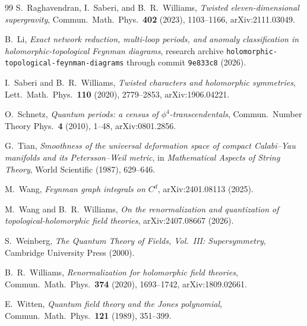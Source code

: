 \documentclass[11pt,a4paper]{article}
\theoremstyle{plain}
\theoremstyle{definition}
\theoremstyle{remark}
\numberwithin{equation}{section}
\numberwithin{figure}{section}
\numberwithin{table}{section}
\def\mathbb#1{#1}%
\begin{document}
\begin{thebibliography}{99}
S.~Raghavendran, I.~Saberi, and B.~R.~Williams,
\emph{Twisted eleven-dimensional supergravity},
Commun.\ Math.\ Phys.\ \textbf{402} (2023), 1103--1166, arXiv:2111.03049.

B.~Li,
\emph{Exact network reduction, multi-loop periods, and anomaly classification in holomorphic-topological Feynman diagrams},
research archive \texttt{holomorphic-topological-feynman-diagrams} through commit \texttt{9e833c8} (2026).

I.~Saberi and B.~R.~Williams,
\emph{Twisted characters and holomorphic symmetries},
Lett.\ Math.\ Phys.\ \textbf{110} (2020), 2779--2853, arXiv:1906.04221.

O.~Schnetz,
\emph{Quantum periods: a census of $\phi^4$-transcendentals},
Commun.\ Number Theory Phys.\ \textbf{4} (2010), 1--48, arXiv:0801.2856.

G.~Tian,
\emph{Smoothness of the universal deformation space of compact Calabi--Yau manifolds and its Petersson--Weil metric},
in \emph{Mathematical Aspects of String Theory}, World Scientific (1987), 629--646.

M.~Wang,
\emph{Feynman graph integrals on $\mathbb{C}^d$},
arXiv:2401.08113 (2025).

M.~Wang and B.~R.~Williams,
\emph{On the renormalization and quantization of topological-holomorphic field theories},
arXiv:2407.08667 (2026).

S.~Weinberg,
\emph{The Quantum Theory of Fields, Vol.~III: Supersymmetry},
Cambridge University Press (2000).

B.~R.~Williams,
\emph{Renormalization for holomorphic field theories},
Commun.\ Math.\ Phys.\ \textbf{374} (2020), 1693--1742, arXiv:1809.02661.

E.~Witten,
\emph{Quantum field theory and the Jones polynomial},
Commun.\ Math.\ Phys.\ \textbf{121} (1989), 351--399.

\end{thebibliography}
\end{document}
